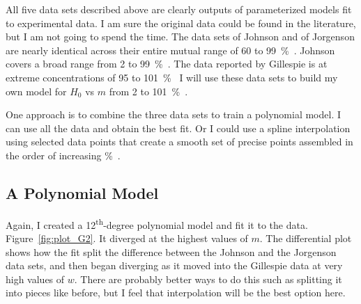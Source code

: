 \documentclass[]{tufte-handout}
\newcommand{\tss}[1]{\textsuperscript{#1}}
\begin{document}
All five data sets described above are clearly outputs of parameterized models fit to experimental data. I am sure the original data could be found in the literature, but I am not going to spend the time. The data sets of Johnson and of Jorgenson are nearly identical across their entire mutual range of 60 to \qty{99}{\percent{}}. Johnson covers a broad range from 2 to \qty{99}{\percent{}}. The data reported by Gillespie is at extreme concentrations of 95 to \qty{101}{\percent{}} I will use these data sets to build my own model for $H_0$ vs $m$ from \num{2} to \qty{101}{\percent{}}.

One approach is to combine the three data sets to train a polynomial model. I can use all the data and obtain the best fit. Or I could use a spline interpolation using selected data points that create a smooth set of precise points assembled in the order of increasing \unit{\percent{}}. 
\clearpage
\subsection{A Polynomial Model}

Again, I created a 12\tss{th}-degree polynomial model and fit it to the data. Figure~\vref{fig:plot_G2}. It diverged at the highest values of $m$. The differential plot shows how the fit split the difference between the Johnson and the Jorgenson data sets, and then began diverging as it moved into the Gillespie data at very high values of $w$. There are probably better ways to do this such as splitting it into pieces like before, but I feel that interpolation will be the best option here.
\end{document}
